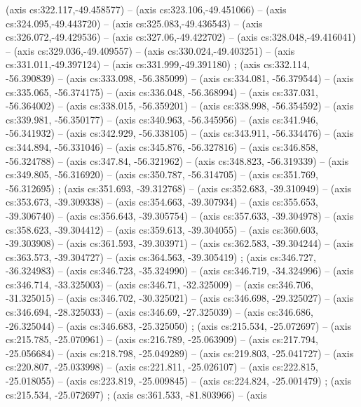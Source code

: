   (axis cs:322.117,-49.458577) --  (axis cs:323.106,-49.451066) --  (axis cs:324.095,-49.443720) --  (axis cs:325.083,-49.436543) --  (axis cs:326.072,-49.429536) --  (axis cs:327.06,-49.422702) --  (axis cs:328.048,-49.416041) --  (axis cs:329.036,-49.409557) --  (axis cs:330.024,-49.403251) --  (axis cs:331.011,-49.397124) --  (axis cs:331.999,-49.391180) ;
   (axis cs:332.114, -56.390839) -- (axis
  cs:333.098, -56.385099) -- (axis cs:334.081, -56.379544) -- (axis
  cs:335.065, -56.374175) -- (axis cs:336.048, -56.368994) -- (axis
  cs:337.031, -56.364002) -- (axis cs:338.015, -56.359201) -- (axis
  cs:338.998, -56.354592) -- (axis cs:339.981, -56.350177) -- (axis
  cs:340.963, -56.345956) -- (axis cs:341.946, -56.341932) -- (axis
  cs:342.929, -56.338105) -- (axis cs:343.911, -56.334476) -- (axis
  cs:344.894, -56.331046) -- (axis cs:345.876, -56.327816) -- (axis
  cs:346.858, -56.324788) -- (axis cs:347.84, -56.321962) -- (axis cs:348.823,
  -56.319339) -- (axis cs:349.805, -56.316920) -- (axis cs:350.787,
  -56.314705) -- (axis cs:351.769, -56.312695) ; 
  (axis cs:351.693, -39.312768) -- (axis cs:352.683, -39.310949) -- (axis
  cs:353.673, -39.309338) -- (axis cs:354.663, -39.307934) -- (axis
  cs:355.653, -39.306740) -- (axis cs:356.643, -39.305754) -- (axis
  cs:357.633, -39.304978) -- (axis cs:358.623, -39.304412) -- (axis
  cs:359.613, -39.304055) -- (axis cs:360.603, -39.303908) -- (axis
  cs:361.593, -39.303971) -- (axis cs:362.583, -39.304244) -- (axis
  cs:363.573, -39.304727) -- (axis cs:364.563, -39.305419)
  ;  (axis cs:346.727, -36.324983) -- (axis
  cs:346.723, -35.324990) -- (axis cs:346.719, -34.324996) -- (axis
  cs:346.714, -33.325003) -- (axis cs:346.71, -32.325009) -- (axis cs:346.706,
  -31.325015) -- (axis cs:346.702, -30.325021) -- (axis cs:346.698,
  -29.325027) -- (axis cs:346.694, -28.325033) -- (axis cs:346.69, -27.325039)
  -- (axis cs:346.686, -26.325044) -- (axis cs:346.683, -25.325050)
  ;  (axis cs:215.534, -25.072697) -- (axis
  cs:215.785, -25.070961) -- (axis cs:216.789, -25.063909) -- (axis
  cs:217.794, -25.056684) -- (axis cs:218.798, -25.049289) -- (axis
  cs:219.803, -25.041727) -- (axis cs:220.807, -25.033998) -- (axis
  cs:221.811, -25.026107) -- (axis cs:222.815, -25.018055) -- (axis
  cs:223.819, -25.009845) -- (axis cs:224.824, -25.001479)
  ;  (axis cs:215.534, -25.072697)
  ;  (axis cs:361.533, -81.803966) -- (axis
